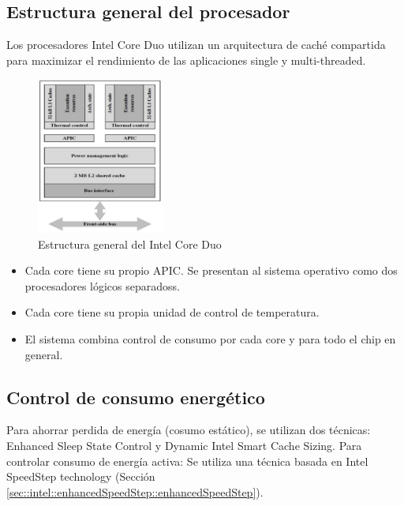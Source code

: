 \subsection{Estructura general del procesador}
Los procesadores Intel Core Duo utilizan un arquitectura de caché compartida para maximizar el rendimiento de las aplicaciones single y multi-threaded.

\begin{figure}[ht]
	\centering
	\includegraphics[width=0.375\textwidth]{imagenes/core-duo-block-diagram}
	\caption{Estructura general del Intel Core Duo}
	\label{fig:intelCoreDuoStructure}
\end{figure}

\begin{itemize}
	\item Cada core tiene su propio APIC. Se presentan al sistema operativo como dos procesadores lógicos separadoss.
	\item Cada core tiene su propia unidad de control de temperatura.
	\item El sistema combina control de consumo por cada core y para todo el chip en general.
\end{itemize}

\subsection{Control de consumo energético}
Para ahorrar perdida de energía (cosumo estático), se utilizan dos técnicas: Enhanced Sleep State Control y Dynamic Intel Smart Cache Sizing. Para controlar consumo de energía activa: Se utiliza una técnica basada en Intel SpeedStep technology (Sección \ref{sec::intel::enhancedSpeedStep::enhancedSpeedStep}).

\paragraph{}
